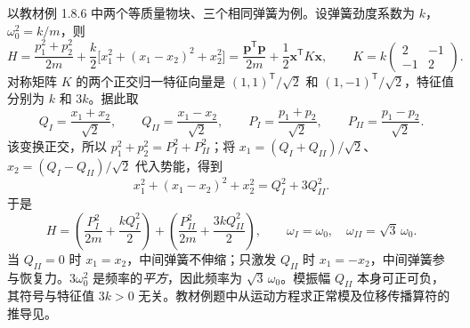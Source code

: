 

以教材例 1.8.6 中两个等质量物块、三个相同弹簧为例。设弹簧劲度系数为 $k$，$\omega_0^2=k/m$，则
\begin{equation}
  H=\frac{p_1^2+p_2^2}{2m}
    +\frac{k}{2}\bigl[x_1^2+(x_1-x_2)^2+x_2^2\bigr]
   =\frac{\mathbf p^{\mathsf T}\mathbf p}{2m}
    +\frac12\mathbf x^{\mathsf T}K\mathbf x,
  \qquad
  K=k\begin{pmatrix}2&-1\\-1&2\end{pmatrix}.
\end{equation}
对称矩阵 $K$ 的两个正交归一特征向量是 $(1,1)^{\mathsf T}/\sqrt2$ 和 $(1,-1)^{\mathsf T}/\sqrt2$，特征值分别为 $k$ 和 $3k$。据此取
\begin{equation}
  Q_I=\frac{x_1+x_2}{\sqrt2},\qquad
  Q_{II}=\frac{x_1-x_2}{\sqrt2},\qquad
  P_I=\frac{p_1+p_2}{\sqrt2},\qquad
  P_{II}=\frac{p_1-p_2}{\sqrt2}.
\end{equation}
该变换正交，所以 $p_1^2+p_2^2=P_I^2+P_{II}^2$；将 $x_1=(Q_I+Q_{II})/\sqrt2$、$x_2=(Q_I-Q_{II})/\sqrt2$ 代入势能，得到
\begin{equation}
  x_1^2+(x_1-x_2)^2+x_2^2=Q_I^2+3Q_{II}^2.
\end{equation}
于是
\begin{equation}
  \boxed{H=\left(\frac{P_I^2}{2m}+\frac{kQ_I^2}{2}\right)
       +\left(\frac{P_{II}^2}{2m}+\frac{3kQ_{II}^2}{2}\right)},
  \qquad
  \boxed{\omega_I=\omega_0,\quad\omega_{II}=\sqrt3\,\omega_0}.
  \label{eq:QM-C07-S01-two-modes}
\end{equation}
当 $Q_{II}=0$ 时 $x_1=x_2$，中间弹簧不伸缩；只激发 $Q_{II}$ 时 $x_1=-x_2$，中间弹簧参与恢复力。$3\omega_0^2$ 是频率的\emph{平方}，因此频率为 $\sqrt3\,\omega_0$。模振幅 $Q_{II}$ 本身可正可负，其符号与特征值 $3k>0$ 无关。教材例题中从运动方程求正常模及位移传播算符的推导见。



